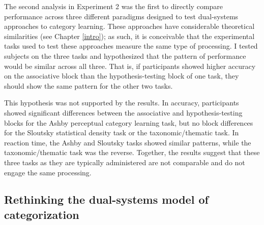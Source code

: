 \documentclass[../dissertation.tex]{subfiles}
\begin{document}
The second analysis in Experiment 2 was the first to directly compare performance across three different paradigms designed to test dual-systems approaches to category learning. These approaches have considerable theoretical similarities (see Chapter \ref{intro}); as such, it is conceivable that the experimental tasks used to test these approaches measure the same type of processing. I tested subjects on the three tasks and hypothesized that the pattern of performance would be similar across all three. That is, if participants showed higher accuracy on the associative block than the hypothesis-testing block of one task, they should show the same pattern for the other two tasks. \par
This hypothesis was not supported by the results. In accuracy, participants showed significant differences between the associative and hypothesis-testing blocks for the Ashby perceptual category learning task, but no block differences for the Sloutsky statistical density task or the taxonomic/thematic task. In reaction time, the Ashby and Sloutsky tasks showed similar patterns, while the taxonomic/thematic task was the reverse. Together, the results suggest that these three tasks as they are typically administered are not comparable and do not engage the same processing.



\subsection{Rethinking the dual-systems model of categorization}
\end{document}
